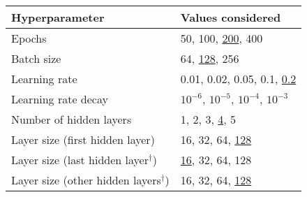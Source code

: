 \begin{tabular}{ll}
  \toprule
  Hyperparameter & Values considered \\
  \midrule
  Epochs & 50, 100, \underline{200}, 400 \\[0.1em]
  Batch size & 64, \underline{128}, 256 \\[0.1em]
  Learning rate & 0.01, 0.02, 0.05, 0.1, \underline{0.2} \\[0.1em]
  Learning rate decay & $10^{-6}$, \underline{$10^{-5}$}, $10^{-4}$, $10^{-3}$ \\[0.1em]
  Number of hidden layers & 1, 2, 3, \underline{4}, 5 \\[0.1em]
  Layer size (first hidden layer) & 16, 32, 64, \underline{128} \\[0.1em]
  Layer size (last hidden layer$^\dagger$) & \underline{16}, 32, 64, 128 \\
  Layer size (other hidden layers$^\dagger$) & 16, 32, 64, \underline{128} \\[0.1em]
  \bottomrule
\end{tabular}

